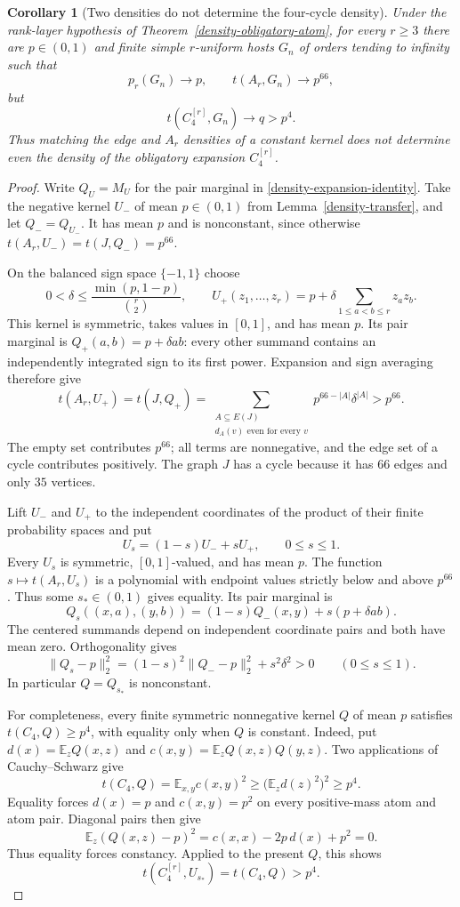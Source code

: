 \documentclass[a4paper,11pt,reqno]{amsart}
\theoremstyle{plain}
\newtheorem{corollary}[theorem]{Corollary}
\theoremstyle{definition}
\theoremstyle{remark}
\begin{document}
\begin{corollary}[Two densities do not determine the four-cycle density]
\label{density-forcing-separation}
Under the rank-layer hypothesis of Theorem~\ref{density-obligatory-atom},
for every $r\ge3$ there are $p\in(0,1)$ and finite simple
$r$-uniform hosts $G_n$ of orders tending to infinity such that
\[
 p_r(G_n)\longrightarrow p,\qquad
 t(A_r,G_n)\longrightarrow p^{66},
\]
but
\[
 t(C_4^{[r]},G_n)\longrightarrow q>p^4.
\]
Thus matching the edge and $A_r$ densities of a constant kernel
does not determine even the density of the obligatory expansion
$C_4^{[r]}$.
\end{corollary}
\begin{proof}
Write $Q_U=M_U$ for the pair marginal in
\eqref{density-expansion-identity}.
Take the negative kernel $U_-$ of mean $p\in(0,1)$ from
Lemma~\ref{density-transfer}, and let $Q_-=Q_{U_-}$.
It has mean $p$ and is nonconstant, since otherwise
$t(A_r,U_-)=t(J,Q_-)=p^{66}$.

On the balanced sign space $\{-1,1\}$ choose
\[
 0<\delta\le \frac{\min(p,1-p)}{\binom r2},
 \qquad
 U_+(z_1,\ldots,z_r)
   =p+\delta\sum_{1\le a<b\le r}z_a z_b.
\]
This kernel is symmetric, takes values in $[0,1]$, and has mean $p$.
Its pair marginal is
$Q_+(a,b)=p+\delta ab$: every other summand contains an independently
integrated sign to its first power.
Expansion and sign averaging therefore give
\[
 t(A_r,U_+)=t(J,Q_+)
 =\sum_{\substack{A\subseteq E(J)\\
                    d_A(v)\text{ even for every }v}}
             p^{66-|A|}\delta^{|A|}
 >p^{66}.
\]
The empty set contributes $p^{66}$; all terms are nonnegative, and
the edge set of a cycle contributes positively.  The graph $J$
has a cycle because it has $66$ edges and only $35$ vertices.

Lift $U_-$ and $U_+$ to the independent coordinates of the product
of their finite probability spaces and put
\[
 U_s=(1-s)U_-+sU_+,\qquad 0\le s\le1.
\]
Every $U_s$ is symmetric, $[0,1]$-valued, and has mean $p$.
The function $s\mapsto t(A_r,U_s)$ is a polynomial with endpoint
values strictly below and above $p^{66}$.
Thus some $s_*\in(0,1)$ gives equality.
Its pair marginal is
\[
 Q_s((x,a),(y,b))=(1-s)Q_-(x,y)+s(p+\delta ab).
\]
The centered summands depend on independent coordinate pairs and
both have mean zero.  Orthogonality gives
\[
 \|Q_s-p\|_2^2
  =(1-s)^2\|Q_--p\|_2^2+s^2\delta^2>0
 \qquad(0\le s\le1).
\]
In particular $Q=Q_{s_*}$ is nonconstant.

For completeness, every finite symmetric nonnegative kernel $Q$
of mean $p$ satisfies $t(C_4,Q)\ge p^4$, with equality only when
$Q$ is constant.  Indeed, put
$d(x)=\mathbb E_zQ(x,z)$ and $c(x,y)=\mathbb E_zQ(x,z)Q(y,z)$.
Two applications of Cauchy--Schwarz give
\[
 t(C_4,Q)=\mathbb E_{x,y}c(x,y)^2
   \ge\bigl(\mathbb E_z d(z)^2\bigr)^2\ge p^4.
\]
Equality forces $d(x)=p$ and $c(x,y)=p^2$ on every positive-mass
atom and atom pair.  Diagonal pairs then give
\[
 \mathbb E_z(Q(x,z)-p)^2=c(x,x)-2p\,d(x)+p^2=0.
\]
Thus equality forces constancy.  Applied to the present $Q$, this
shows
\[
 t(C_4^{[r]},U_{s_*})=t(C_4,Q)>p^4.
\]


\end{proof}
\end{document}
